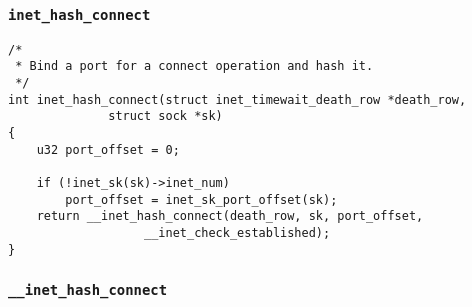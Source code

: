  	       \subsubsection{\texttt{inet_hash_connect}}
\begin{verbatim}
/*
 * Bind a port for a connect operation and hash it.
 */
int inet_hash_connect(struct inet_timewait_death_row *death_row,
              struct sock *sk)
{
    u32 port_offset = 0;

    if (!inet_sk(sk)->inet_num)
        port_offset = inet_sk_port_offset(sk);
    return __inet_hash_connect(death_row, sk, port_offset,
                   __inet_check_established);
}
\end{verbatim}

        \subsubsection{\texttt{__inet_hash_connect}}     
